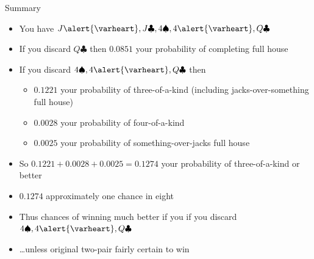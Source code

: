 \documentclass[handout]{beamer}
\theoremstyle{definition}
\newcommand{\hs}{\alert{\varheart}}
\newcommand{\s}{\spadesuit}
\newcommand{\cs}{\clubsuit}
\begin{document}
\begin{frame}{Summary}
\begin{itemize}
\item You have $J\hs,J\cs,4\s,4\hs,Q\cs$
\item If you discard $Q\cs$ then $0.0851$
your probability of completing full house
\item If you discard $4\s,4\hs,Q\cs$ then
\begin{itemize}
\item $0.1221$ your probability of three-of-a-kind
(including jacks-over-something full house)
\item $0.0028$ your probability of four-of-a-kind
\item $0.0025$ your probability of something-over-jacks full house
\end{itemize}
\item So $0.1221+0.0028+0.0025=0.1274$ your probability
of three-of-a-kind or better
\item $0.1274$ approximately one chance in eight
\item Thus chances of winning much better if you
if you discard $4\s,4\hs,Q\cs$
\item \dots unless original two-pair fairly certain to win
\end{itemize}
\end{frame}
\end{document}
